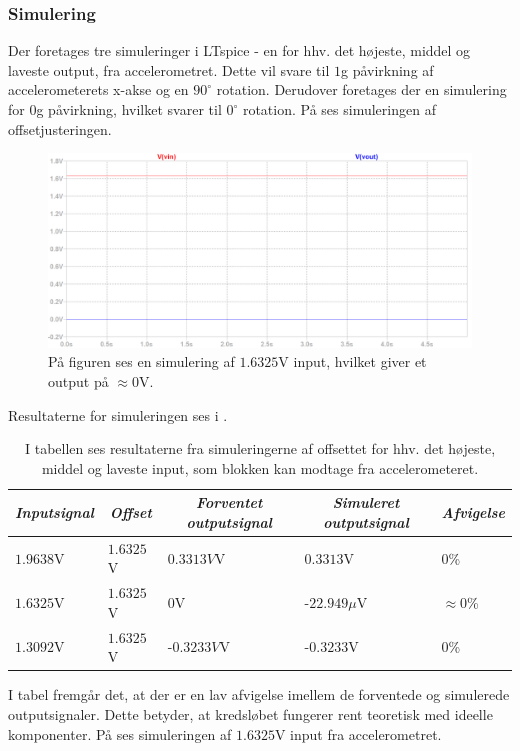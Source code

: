 \subsubsection{Simulering}
Der foretages tre simuleringer i LTspice - en for hhv. det højeste, middel og laveste output, fra accelerometret. Dette vil svare til $1$g påvirkning af accelerometerets x-akse og en $90^{\circ}$ rotation. Derudover foretages der en simulering for $0$g påvirkning, hvilket svarer til $0^{\circ}$ rotation. På  ses simuleringen af offsetjusteringen.
\begin{figure}[H]
	\centering
	\includegraphics[scale=0.38]{figures/cProblemloesning/Offset_simulering.png}
	\caption{På figuren ses en simulering af $1.6325$V input, hvilket giver et output på $\approx 0$V.}
	\label{fig:Offset_simulering}
\end{figure}
\noindent Resultaterne for simuleringen ses i .
\begin{table}[H]
	\centering
	\begin{tabular}{|l|l|l|l|l|}
		\hline
		\multicolumn{1}{|c|}{\textit{Inputsignal}} & \multicolumn{1}{c|}{\textit{Offset}} & \multicolumn{1}{c|}{\textit{Forventet outputsignal}} & \multicolumn{1}{c|}{\textit{Simuleret outputsignal}} & \multicolumn{1}{c|}{\textit{Afvigelse}} \\ \hline
		$1.9638$V     & $1.6325$V    & $0.3313V$V    & $0.3313$V       & $0$\%              \\ \hline
		$1.6325$V     & $1.6325$V    & $0$V          & -$22.949\mu$V   & $\approx 0$\%      \\ \hline
		$1.3092$V     & $1.6325$V    & -$0.3233V$V   & -$0.3233$V      & $0$\%                \\ \hline
	\end{tabular}
	\caption{I tabellen ses resultaterne fra simuleringerne af offsettet for hhv. det højeste, middel og laveste input, som blokken kan modtage fra accelerometeret.}
	\label{Tab:offset_sim}
\end{table} 
\noindent I tabel  fremgår det, at der er en lav afvigelse imellem de forventede og simulerede outputsignaler. Dette betyder, at kredsløbet fungerer rent teoretisk med ideelle komponenter. På  ses simuleringen af $1.6325$V input fra accelerometret.
